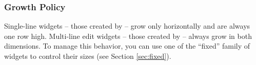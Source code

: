 \subsubsection{Growth Policy}

Single-line  widgets -- those created by  --
grow only horizontally and are always one row high.  Multi-line edit
widgets -- those created by  -- always grow in
both dimensions.  To manage this behavior, you can use one of the
``fixed'' family of widgets to control their sizes (see Section
\ref{sec:fixed}).
